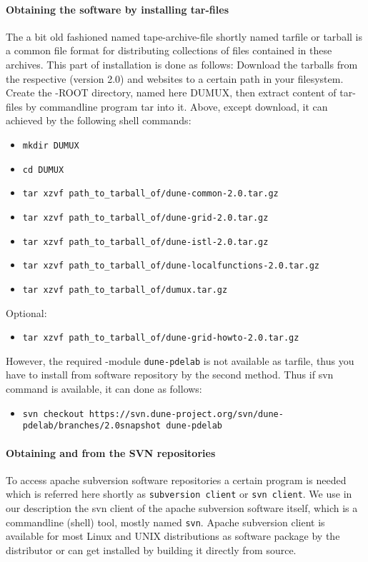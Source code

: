 \paragraph{Obtaining the software by installing tar-files}
The a bit old fashioned named tape-archive-file shortly named tarfile or tarball is a common file format for distributing collections of files contained in these archives.
This part of installation is done as follows: 
Download the tarballs from the respective \Dune (version 2.0) and \Dumux websites to a certain path in your filesystem.
Create the {\Dune}-ROOT directory, named here DUMUX, then extract content of tar-files by commandline program tar into it.
Above, except download, it can achieved by the following shell commands:
\begin{itemize}
\item \texttt{mkdir DUMUX}
\item \texttt{cd DUMUX}
\item \texttt{tar xzvf path\_to\_tarball\_of/dune-common-2.0.tar.gz }
\item \texttt{tar xzvf path\_to\_tarball\_of/dune-grid-2.0.tar.gz }
\item \texttt{tar xzvf path\_to\_tarball\_of/dune-istl-2.0.tar.gz }
\item \texttt{tar xzvf path\_to\_tarball\_of/dune-localfunctions-2.0.tar.gz }
\item \texttt{tar xzvf path\_to\_tarball\_of/dumux.tar.gz}
\end{itemize} 
Optional:
\begin{itemize}
\item \texttt{tar xzvf path\_to\_tarball\_of/dune-grid-howto-2.0.tar.gz}
\end{itemize} 
However, the required \Dune-module \texttt{dune-pdelab} is not available as tarfile, thus you have to install from software repository by the second method.  Thus if svn command is available, it can done as follows: 
\begin{itemize}
\item \texttt{svn checkout https://svn.dune-project.org/svn/dune-pdelab/branches/2.0snapshot dune-pdelab}
\end{itemize} 

\paragraph{Obtaining \Dune and \Dumux from the SVN repositories} 

To access apache subversion software repositories a certain program is needed which is referred here shortly as \texttt{subversion client} or \texttt{svn client}. We use in our description the svn client of the apache subversion software itself, which is a commandline (shell) tool, mostly named \texttt{svn}. 
Apache subversion client is available for most Linux and UNIX distributions as software package by the distributor or can get installed by building it directly from source.

